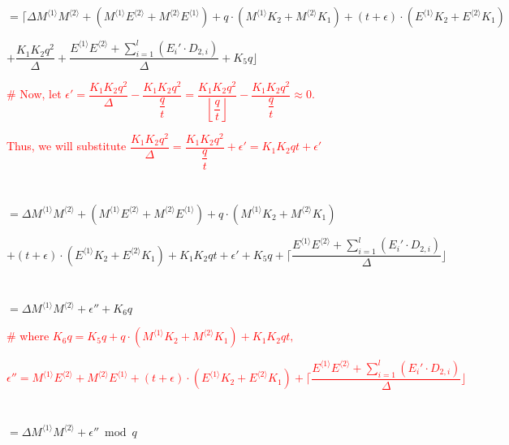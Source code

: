  $ $

 $ $

$ = \Bigg\lceil\Delta M^{\langle 1 \rangle}M^{\langle 2 \rangle} + (M^{\langle 1 \rangle}E^{\langle 2 \rangle} + M^{\langle 2 \rangle}E^{\langle 1 \rangle}) + q\cdot (M^{\langle 1 \rangle}K_2 +  M^{\langle 2 \rangle}K_1) + (t + \epsilon)\cdot(E^{\langle 1 \rangle}K_2 + E^{\langle 2 \rangle}K_1)$

\text{ } \text{ } $ + \dfrac{K_1K_2q^2}{\Delta}   
 + \dfrac{E^{\langle 1 \rangle} E^{\langle 2 \rangle} + \sum\limits_{i=1}^{l} (E_i'\cdot D_{2,i})}{\Delta} + K_5q\Bigg\rfloor $

\text{ } \text{ }  \textcolor{red}{ \# Now, let $\epsilon' = \dfrac{K_1K_2q^2}{\Delta} - \dfrac{K_1K_2q^2}{\dfrac{q}{t}} = \dfrac{K_1K_2q^2}{\left\lfloor\dfrac{q}{t}\right\rfloor} - \dfrac{K_1K_2q^2}{\dfrac{q}{t}} \approx 0$.}

\text{ } \text{ }  \textcolor{red}{ Thus, we will substitute $\dfrac{K_1K_2q^2}{\Delta} = \dfrac{K_1K_2q^2}{\dfrac{q}{t}} + \epsilon' = K_1K_2qt + \epsilon'$}
 
 $ $

 $ $

$ = \Delta M^{\langle 1 \rangle}M^{\langle 2 \rangle} + (M^{\langle 1 \rangle}E^{\langle 2 \rangle} + M^{\langle 2 \rangle}E^{\langle 1 \rangle}) + q\cdot (M^{\langle 1 \rangle}K_2 +  M^{\langle 2 \rangle}K_1) $

\text{ } \text{ } $+ (t + \epsilon)\cdot(E^{\langle 1 \rangle}K_2 + E^{\langle 2 \rangle}K_1) + K_1K_2qt + \epsilon'   
 + K_5q + \Bigg\lceil\dfrac{E^{\langle 1 \rangle} E^{\langle 2\rangle} + \sum\limits_{i=1}^{l} (E_i'\cdot D_{2,i}) }{\Delta}\Bigg\rfloor $

 $ $

 $ $

$ = \Delta M^{\langle 1 \rangle}M^{\langle 2 \rangle} + \epsilon'' + K_6q$


\textcolor{red}{ \# where $K_6q = K_5q + q\cdot(M^{\langle 1 \rangle}K_2 +  M^{\langle 2 \rangle}K_1) + K_1K_2qt, $}

\textcolor{red}{$ \epsilon'' = M^{\langle 1 \rangle}E^{\langle 2 \rangle} + M^{\langle 2 \rangle}E^{\langle 1 \rangle} + (t + \epsilon)\cdot(E^{\langle 1 \rangle}K_2 + E^{\langle 2 \rangle}K_1) + \Bigg\lceil\dfrac{E^{\langle 1 \rangle} E^{\langle 2 \rangle} + \sum\limits_{i=1}^{l} (E_i'\cdot D_{2,i})}{\Delta}\Bigg\rfloor$} 


$ $

$ $


$ = \Delta M^{\langle 1 \rangle}M^{\langle 2 \rangle} + \epsilon'' \bmod q$



